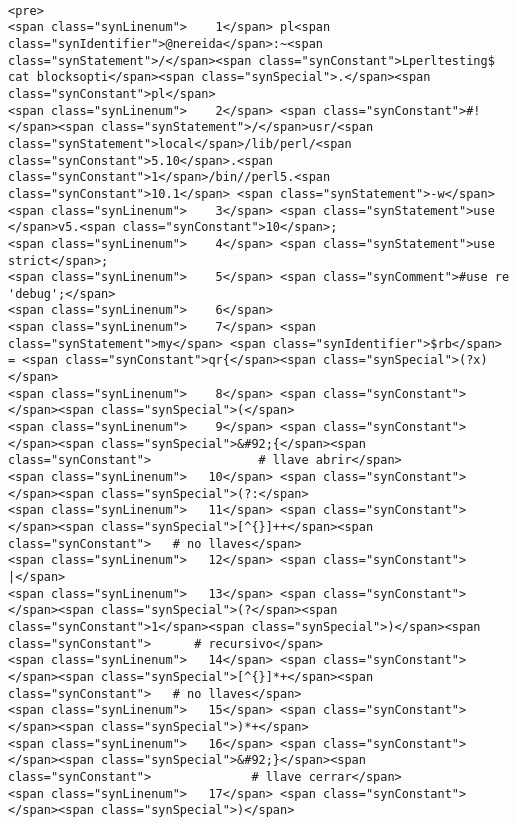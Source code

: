 \begin{verbatim}

<pre>
<span class="synLinenum">    1</span> pl<span class="synIdentifier">@nereida</span>:~<span class="synStatement">/</span><span class="synConstant">Lperltesting$ cat blocksopti</span><span class="synSpecial">.</span><span class="synConstant">pl</span>
<span class="synLinenum">    2</span> <span class="synConstant">#!</span><span class="synStatement">/</span>usr/<span class="synStatement">local</span>/lib/perl/<span class="synConstant">5.10</span>.<span class="synConstant">1</span>/bin//perl5.<span class="synConstant">10.1</span> <span class="synStatement">-w</span>
<span class="synLinenum">    3</span> <span class="synStatement">use </span>v5.<span class="synConstant">10</span>;
<span class="synLinenum">    4</span> <span class="synStatement">use strict</span>;
<span class="synLinenum">    5</span> <span class="synComment">#use re 'debug';</span>
<span class="synLinenum">    6</span> 
<span class="synLinenum">    7</span> <span class="synStatement">my</span> <span class="synIdentifier">$rb</span> = <span class="synConstant">qr{</span><span class="synSpecial">(?x)</span>
<span class="synLinenum">    8</span> <span class="synConstant">    </span><span class="synSpecial">(</span>
<span class="synLinenum">    9</span> <span class="synConstant">      </span><span class="synSpecial">&#92;{</span><span class="synConstant">               # llave abrir</span>
<span class="synLinenum">   10</span> <span class="synConstant">         </span><span class="synSpecial">(?:</span>
<span class="synLinenum">   11</span> <span class="synConstant">             </span><span class="synSpecial">[^{}]++</span><span class="synConstant">   # no llaves</span>
<span class="synLinenum">   12</span> <span class="synConstant">         |</span>
<span class="synLinenum">   13</span> <span class="synConstant">             </span><span class="synSpecial">(?</span><span class="synConstant">1</span><span class="synSpecial">)</span><span class="synConstant">      # recursivo</span>
<span class="synLinenum">   14</span> <span class="synConstant">             </span><span class="synSpecial">[^{}]*+</span><span class="synConstant">   # no llaves</span>
<span class="synLinenum">   15</span> <span class="synConstant">         </span><span class="synSpecial">)*+</span>
<span class="synLinenum">   16</span> <span class="synConstant">       </span><span class="synSpecial">&#92;}</span><span class="synConstant">              # llave cerrar</span>
<span class="synLinenum">   17</span> <span class="synConstant">    </span><span class="synSpecial">)</span>

\end{verbatim}
